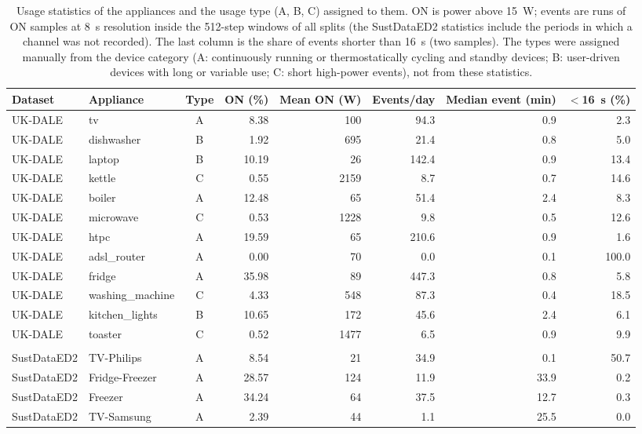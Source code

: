 \begin{table}[H]
\centering
\caption{Usage statistics of the appliances and the usage type (A, B, C) assigned to them. ON is power above 15~W; events are runs of ON samples at 8~s resolution inside the 512-step windows of all splits (the SustDataED2 statistics include the periods in which a channel was not recorded). The last column is the share of events shorter than 16~s (two samples). The types were assigned manually from the device category (A: continuously running or thermostatically cycling and standby devices; B: user-driven devices with long or variable use; C: short high-power events), not from these statistics.}
\label{tab:appliance_usage}
\footnotesize
\begin{tabular}{@{}llcrrrrr@{}}
\toprule
Dataset & Appliance & Type & ON (\%) & Mean ON (W) & Events/day & Median event (min) & $<$16~s (\%) \\
\midrule
UK-DALE & tv & A & 8.38 & 100 & 94.3 & 0.9 & 2.3 \\
UK-DALE & dishwasher & B & 1.92 & 695 & 21.4 & 0.8 & 5.0 \\
UK-DALE & laptop & B & 10.19 & 26 & 142.4 & 0.9 & 13.4 \\
UK-DALE & kettle & C & 0.55 & 2159 & 8.7 & 0.7 & 14.6 \\
UK-DALE & boiler & A & 12.48 & 65 & 51.4 & 2.4 & 8.3 \\
UK-DALE & microwave & C & 0.53 & 1228 & 9.8 & 0.5 & 12.6 \\
UK-DALE & htpc & A & 19.59 & 65 & 210.6 & 0.9 & 1.6 \\
UK-DALE & adsl\_router & A & 0.00 & 70 & 0.0 & 0.1 & 100.0 \\
UK-DALE & fridge & A & 35.98 & 89 & 447.3 & 0.8 & 5.8 \\
UK-DALE & washing\_machine & C & 4.33 & 548 & 87.3 & 0.4 & 18.5 \\
UK-DALE & kitchen\_lights & B & 10.65 & 172 & 45.6 & 2.4 & 6.1 \\
UK-DALE & toaster & C & 0.52 & 1477 & 6.5 & 0.9 & 9.9 \\
\midrule \\
SustDataED2 & TV-Philips & A & 8.54 & 21 & 34.9 & 0.1 & 50.7 \\
SustDataED2 & Fridge-Freezer & A & 28.57 & 124 & 11.9 & 33.9 & 0.2 \\
SustDataED2 & Freezer & A & 34.24 & 64 & 37.5 & 12.7 & 0.3 \\
SustDataED2 & TV-Samsung & A & 2.39 & 44 & 1.1 & 25.5 & 0.0 \\

\end{tabular}
\end{table}

